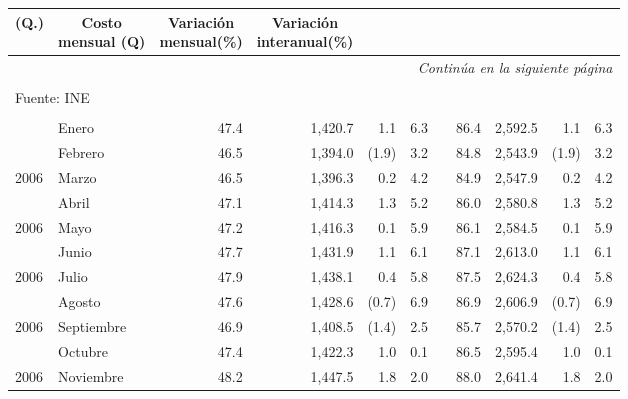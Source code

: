 \begin{center}
\begin{longtable}{llrrrrrrrrr}
{{				(Q.)}} &  \multicolumn{1}{c}{\small\parbox{1.4cm}{Costo\\ mensual (Q)}} &\multicolumn{1}{c}{\small\parbox{1.4cm}{Variación\\ mensual(\%)}} & \multicolumn{1}{c}{\small\parbox{1.4cm}{Variación\\ interanual(\%)}}\\						     
		\hline\endhead
		\hline \multicolumn{11}{r}{\textit{Continúa en la siguiente página}} \\
		\endfoot
		&&&&&&&&&& \\[-0.9cm]
		\multicolumn{11}{l}{\footnotesize Fuente: INE}\\
		\endlastfoot
		\rowcolor{color1!0!white}    &&&&&&&&&& \\[-0.55cm]
		\rowcolor{color1!0!white}\multicolumn{1}{l}{2006} &	Enero	&	 47.4 	&	 1,420.7 	&	 1.1 	&	 6.3 	&  &	 86.4 	&	 2,592.5 	&	 1.1 	&	 6.3 	\\
		\rowcolor{color1!5!white}\multicolumn{1}{l}{	2006	}&	Febrero	&	 46.5 	&	 1,394.0 	&	 (1.9)	&	 3.2 	&  &	 84.8 	&	 2,543.9 	&	 (1.9)	&	 3.2 	\\
		\multicolumn{1}{l}{	2006	}&	Marzo	&	 46.5 	&	 1,396.3 	&	 0.2 	&	 4.2 	&  &	 84.9 	&	 2,547.9 	&	 0.2 	&	 4.2 	\\
		\rowcolor{color1!5!white}\multicolumn{1}{l}{	2006	}&	Abril	&	 47.1 	&	 1,414.3 	&	 1.3 	&	 5.2 	&  &	 86.0 	&	 2,580.8 	&	 1.3 	&	 5.2 	\\
		\multicolumn{1}{l}{	2006	}&	Mayo	&	 47.2 	&	 1,416.3 	&	 0.1 	&	 5.9 	&  &	 86.1 	&	 2,584.5 	&	 0.1 	&	 5.9 	\\
		\rowcolor{color1!5!white}\multicolumn{1}{l}{	2006	}&	Junio	&	 47.7 	&	 1,431.9 	&	 1.1 	&	 6.1 	&  &	 87.1 	&	 2,613.0 	&	 1.1 	&	 6.1 	\\
		\multicolumn{1}{l}{	2006	}&	Julio	&	 47.9 	&	 1,438.1 	&	 0.4 	&	 5.8 	&  &	 87.5 	&	 2,624.3 	&	 0.4 	&	 5.8 	\\
		\rowcolor{color1!5!white}\multicolumn{1}{l}{	2006	}&	Agosto	&	 47.6 	&	 1,428.6 	&	 (0.7)	&	 6.9 	&  &	 86.9 	&	 2,606.9 	&	 (0.7)	&	 6.9 	\\
		\multicolumn{1}{l}{	2006	}&	Septiembre	&	 46.9 	&	 1,408.5 	&	 (1.4)	&	 2.5 	&  &	 85.7 	&	 2,570.2 	&	 (1.4)	&	 2.5 	\\
		\rowcolor{color1!5!white}\multicolumn{1}{l}{	2006	}&	Octubre	&	 47.4 	&	 1,422.3 	&	 1.0 	&	 0.1 	&  &	 86.5 	&	 2,595.4 	&	 1.0 	&	 0.1 	\\
		\multicolumn{1}{l}{	2006	}&	Noviembre	&	 48.2 	&	 1,447.5 	&	 1.8 	&	 2.0 	&  &	 88.0 	&	 2,641.4 	&	 1.8 	&	 2.0 	\\

\end{longtable}
\end{center}
